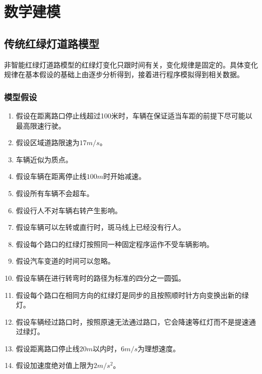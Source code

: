 \documentclass[a4paper,12pt]{article}
\numberwithin{equation}{section}
\begin{document}
	\section{数学建模}
	\subsection{传统红绿灯道路模型}
非智能红绿灯道路模型的红绿灯变化只跟时间有关，变化规律是固定的。具体变化规律在基本假设的基础上由逐步分析得到，接着进行程序模拟得到相关数据。
	\subsubsection{模型假设}
	\begin{enumerate}
		\item 假设在距离路口停止线超过100米时，车辆在保证适当车距的前提下尽可能以最高限速行驶。
		\item 假设区域道路限速为$17m/s$。
		\item 车辆近似为质点。
		\item 假设车辆在距离停止线$100m$时开始减速。
		\item 假设所有车辆不会超车。
		\item 假设行人不对车辆右转产生影响。
		\item 假设车辆可以左转或直行时，斑马线上已经没有行人。
		\item 假设每个路口的红绿灯按照同一种固定程序运作不受车辆影响。
		\item 假设汽车变道的时间可以忽略。
		\item 假设车辆在进行转弯时的路径为标准的四分之一圆弧。
		\item 假设每个路口在相同方向的红绿灯是同步的且按照顺时针方向变换出新的绿灯。
		\item 假设车辆经过路口时，按照原速无法通过路口，它会降速等红灯而不是提速通过绿灯。
		\item 假设距离路口停止线$20m$以内时，$6m/s$为理想速度。
		\item 假设加速度绝对值上限为$2m/s^2$。
	\end{enumerate}
	
\end{document}
